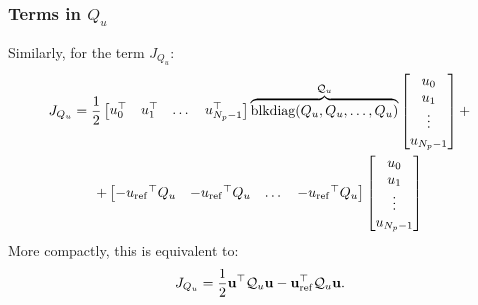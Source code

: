 \documentclass[a4paper,12pt,fleqn]{article}
\newcommand{\varuvec}{\mathbf{u}}
\newcommand{\Np}{{N_p}}
\newcommand{\blkdiag}{\text{blkdiag}}
\begin{document}
 \subsubsection{Terms in $Q_u$}
 Similarly, for the term $J_{Q_u}$: 
\begin{multline}
\label{eq:J_Qu}
 J_{Q_u} = \frac{1}{2}
 \begin{bmatrix}
  u_0^\top & u_1^\top &\dots & u_{\Np-1}^\top
 \end{bmatrix}
 \overbrace{\blkdiag(Q_u, Q_u, \dots, Q_u)}^{\mathcal{Q}_u}
 \begin{bmatrix}
  u_0 \\  u_1\\ \vdots\\  u_{\Np-1}
 \end{bmatrix}
  + \\
 +
  \begin{bmatrix}
  -{u_{\rm ref}}^\top Q_u & -{u_{\rm ref}}^\top Q_u &\dots & -{u_{\rm ref}}^\top Q_u
 \end{bmatrix}
 \begin{bmatrix}
  u_0 \\ u_1 \\ \vdots \\ u_{\Np-1}
 \end{bmatrix} 
 \end{multline}
 More compactly, this is equivalent to:
 \begin{equation}
  J_{Q_u} = \frac{1}{2} \varuvec^\top \mathcal{Q}_u \varuvec - \varuvec_{\rm ref}^\top \mathcal{Q}_u \varuvec.
 \end{equation}
\end{document}
